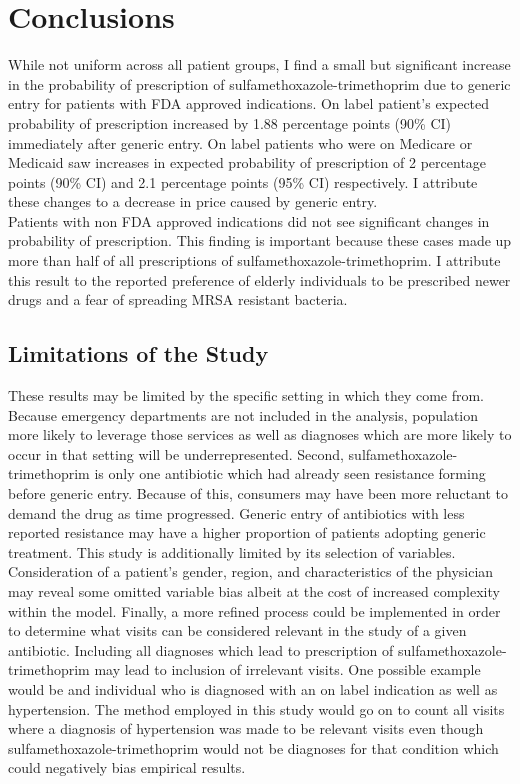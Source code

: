 \chapter{Conclusions}
While not uniform across all patient groups, I find a small but significant increase in the probability of prescription of sulfamethoxazole-trimethoprim due to generic entry for patients with FDA approved indications. On label patient's expected probability of prescription increased by 1.88 percentage points (90\% CI) immediately after generic entry. On label patients who were on Medicare or Medicaid saw increases in expected probability of prescription of 2 percentage points (90\% CI) and 2.1 percentage points (95\% CI) respectively. I attribute these changes to a decrease in price caused by generic entry.\\
\indent Patients with non FDA approved indications did not see significant changes in probability of prescription. This finding is important because these cases made up more than half of all prescriptions of sulfamethoxazole-trimethoprim. I attribute this result to the reported preference of elderly individuals to be prescribed newer drugs and a fear of spreading MRSA resistant bacteria.

\section{Limitations of the Study}
These results may be limited by the specific setting in which they come from. Because emergency departments are not included in the analysis, population more likely to leverage those services as well as diagnoses which are more likely to occur in that setting will be underrepresented. Second, sulfamethoxazole-trimethoprim is only one antibiotic which had already seen resistance forming before generic entry. Because of this, consumers may have been more reluctant to demand the drug as time progressed. Generic entry of antibiotics with less reported resistance may have a higher proportion of patients adopting generic treatment. This study is additionally limited by its selection of variables. Consideration of a patient's gender, region, and characteristics of the physician may reveal some omitted variable bias albeit at the cost of increased complexity within the model. Finally, a more refined process could be implemented in order to determine what visits can be considered relevant in the study of a given antibiotic. Including all diagnoses which lead to prescription of sulfamethoxazole-trimethoprim may lead to inclusion of irrelevant visits. One possible example would be and individual who is diagnosed with an on label indication as well as hypertension. The method employed in this study would go on to count all visits where a diagnosis of hypertension was made to be relevant visits even though sulfamethoxazole-trimethoprim would not be diagnoses for that condition which could negatively bias empirical results. 

